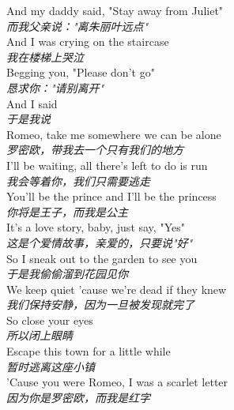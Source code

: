 \begin{spacing}{1.5}
\begin{flushleft}
And my daddy said, "Stay away from Juliet"\\
\textit{而我父亲说："离朱丽叶远点"}\\[0.5em]

And I was crying on the staircase\\
\textit{我在楼梯上哭泣}\\[0.5em]

Begging you, "Please don't go"\\
\textit{恳求你："请别离开"}\\[0.5em]

And I said\\
\textit{于是我说}\\[0.5em]

Romeo, take me somewhere we can be alone\\
\textit{罗密欧，带我去一个只有我们的地方}\\[0.5em]

I'll be waiting, all there's left to do is run\\
\textit{我会等着你，我们只需要逃走}\\[0.5em]

You'll be the prince and I'll be the princess\\
\textit{你将是王子，而我是公主}\\[0.5em]

It's a love story, baby, just say, "Yes"\\
\textit{这是个爱情故事，亲爱的，只要说"好"}\\[0.5em]

So I sneak out to the garden to see you\\
\textit{于是我偷偷溜到花园见你}\\[0.5em]

We keep quiet 'cause we're dead if they knew\\
\textit{我们保持安静，因为一旦被发现就完了}\\[0.5em]

So close your eyes\\
\textit{所以闭上眼睛}\\[0.5em]

Escape this town for a little while\\
\textit{暂时逃离这座小镇}\\[0.5em]

'Cause you were Romeo, I was a scarlet letter\\
\textit{因为你是罗密欧，而我是红字}\\[0.5em]


\end{flushleft}
\end{spacing}
